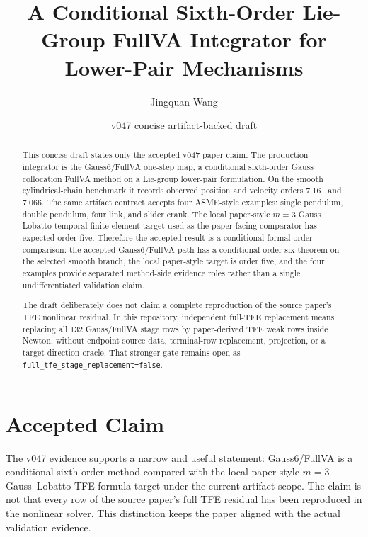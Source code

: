 \documentclass[11pt]{article}
\title{A Conditional Sixth-Order Lie-Group FullVA Integrator for Lower-Pair Mechanisms}
\author{Jingquan Wang}
\date{v047 concise artifact-backed draft}
\newcommand{\method}{Gauss6\slash FullVA}
\newcommand{\tfe}{TFE}
\begin{document}
\maketitle

\begin{abstract}
This concise draft states only the accepted v047 paper claim.  The production
integrator is the \method{} one-step map, a conditional sixth-order Gauss
collocation FullVA method on a Lie-group lower-pair formulation.  On the smooth
cylindrical-chain benchmark it records observed position and velocity orders
7.161 and 7.066.  The same artifact contract accepts four ASME-style examples:
single pendulum, double pendulum, four link, and slider crank.  The local
paper-style $m=3$ Gauss--Lobatto temporal finite-element target used as the
paper-facing comparator has expected order five.  Therefore the accepted
result is a conditional formal-order comparison: the accepted \method{} path
has a conditional order-six theorem on the selected smooth branch, the local
paper-style target is order five, and the four examples provide separated
method-side evidence roles rather than a single undifferentiated validation
claim.

The draft deliberately does not claim a complete reproduction of the source
paper's \tfe{} nonlinear residual.  In this repository, independent full-\tfe{}
replacement means replacing all 132 Gauss/FullVA stage rows by paper-derived
\tfe{} weak rows inside Newton, without endpoint source data, terminal-row
replacement, projection, or a target-direction oracle.  That stronger gate
remains open as \nolinkurl{full_tfe_stage_replacement=false}.
\end{abstract}

\section{Accepted Claim}

The v047 evidence supports a narrow and useful statement: \method{} is a
conditional sixth-order method compared with the local paper-style $m=3$
Gauss--Lobatto \tfe{} formula target under the current artifact scope.  The
claim is not that every row of the source paper's full \tfe{} residual has been reproduced in the
nonlinear solver.  This distinction keeps the paper aligned with the actual
validation evidence.
\end{document}
